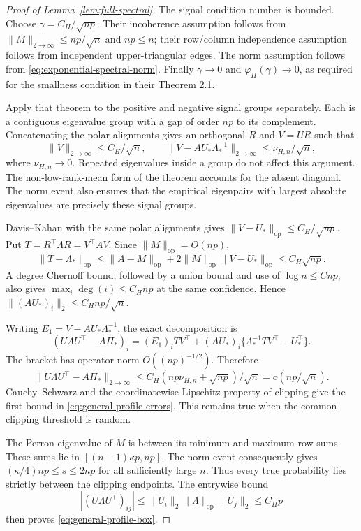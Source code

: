 \begin{proof}[Proof of Lemma~\ref{lem:full-spectral}]
The signal condition number is bounded.  Choose
$\gamma=C_H/\sqrt{np}$.  Their incoherence assumption follows from
$\|M\|_{2\to\infty}\le np/\sqrt n$ and $np\le n$;
their row/column independence assumption follows from independent
upper-triangular edges.  The norm assumption follows from
\eqref{eq:exponential-spectral-norm}.  Finally
$\gamma\to0$ and $\varphi_H(\gamma)\to0$, as required for the
smallness condition in their Theorem 2.1.

Apply that theorem to the positive and negative signal groups
separately.  Each is a contiguous eigenvalue group with a gap of
order $np$ to its complement.  Concatenating the polar alignments
gives an orthogonal $R$ and $V=UR$ such that
\begin{equation}
 \|V\|_{2\to\infty}\le C_H/\sqrt n,\qquad
 \|V-AU_*\Lambda_*^{-1}\|_{2\to\infty}
        \le\nu_{H,n}/\sqrt n,
 \label{eq:general-first-order}
\end{equation}
where $\nu_{H,n}\to0$.  Repeated eigenvalues inside a group do not
affect this argument.  The non-low-rank-mean form of the theorem
accounts for the absent diagonal.  The norm event also ensures
that the empirical eigenpairs with largest absolute eigenvalues
are precisely these signal groups.

Davis--Kahan with the same polar alignments gives
$\|V-U_*\|_{\mathrm{op}}\le C_H/\sqrt{np}$.
Put $T=R^\top\Lambda R=V^\top AV$.  Since
$\|M\|_{\mathrm{op}}=O(np)$,
\[
 \|T-\Lambda_*\|_{\mathrm{op}}
 \le\|A-M\|_{\mathrm{op}}
       +2\|M\|_{\mathrm{op}}\|V-U_*\|_{\mathrm{op}}
 \le C_H\sqrt{np}.
\]
A degree Chernoff bound, followed by a union bound and use of
$\log n\le Cnp$, also gives
$\max_i\deg(i)\le C_Hnp$ at the same confidence.  Hence
$\|(AU_*)_i\|_2\le C_Hnp/\sqrt n$.

Writing $E_1=V-AU_*\Lambda_*^{-1}$, the exact decomposition is
\[
 (U\Lambda U^\top-A\Pi_*)_i
 = (E_1)_iTV^\top
   +(AU_*)_i\{\Lambda_*^{-1}TV^\top-U_*^\top\}.
\]
The bracket has operator norm $O((np)^{-1/2})$.  Therefore
\[
 \|U\Lambda U^\top-A\Pi_*\|_{2\to\infty}
 \le C_H(np\nu_{H,n}+\sqrt{np})/\sqrt n
 =o(np/\sqrt n).
\]
Cauchy--Schwarz and the coordinatewise Lipschitz property of
clipping give the first bound in
\eqref{eq:general-profile-errors}.  This remains true when the
common clipping threshold is random.

The Perron eigenvalue of $M$ is between its minimum and maximum
row sums.  These sums lie in
$[(n-1)\kappa p,np]$.
The norm event consequently gives
$(\kappa/4)np\le s\le2np$ for all sufficiently large $n$.
Thus every true probability lies strictly between the clipping
endpoints.  The entrywise bound
\[
 |(U\Lambda U^\top)_{ij}|
 \le\|U_i\|_2\|\Lambda\|_{\mathrm{op}}\|U_j\|_2
 \le C_Hp
\]
then proves \eqref{eq:general-profile-box}.


\end{proof}
